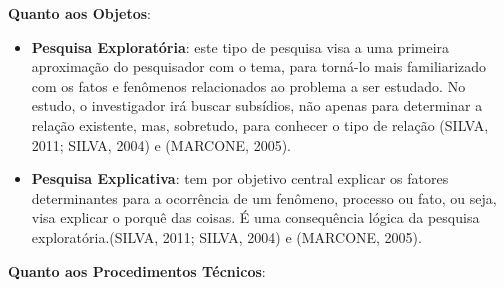 \textbf{Quanto aos Objetos}: 

\begin{itemize}
\item \textbf{Pesquisa Exploratória}: este tipo de pesquisa visa a uma primeira aproximação do pesquisador com o tema, para torná-lo mais familiarizado com os fatos e fenômenos relacionados ao problema a ser estudado. No estudo, o investigador irá buscar subsídios, não apenas para determinar a relação existente, mas, sobretudo, para conhecer o tipo de relação (SILVA, 2011; SILVA, 2004) e (MARCONE, 2005).
\item \textbf{Pesquisa Explicativa}: tem por objetivo central explicar os fatores determinantes para a ocorrência de um fenômeno, processo ou fato, ou seja, visa explicar o porquê das coisas. É uma consequência lógica da pesquisa exploratória.(SILVA, 2011; SILVA, 2004) e (MARCONE, 2005).
\end{itemize}


\textbf{Quanto aos Procedimentos Técnicos}: 

